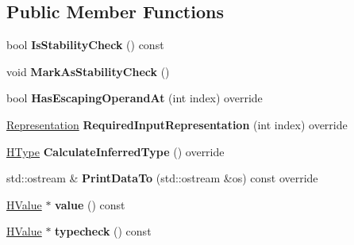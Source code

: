 \subsection*{Public Member Functions}
\begin{DoxyCompactItemize}
\item 
bool {\bfseries Is\+Stability\+Check} () const \hypertarget{classv8_1_1internal_1_1_h_check_maps_a13e2bd03de518bfae85d711193d50f32}{}\label{classv8_1_1internal_1_1_h_check_maps_a13e2bd03de518bfae85d711193d50f32}

\item 
void {\bfseries Mark\+As\+Stability\+Check} ()\hypertarget{classv8_1_1internal_1_1_h_check_maps_a2665115c8a59adaa1b01f99b6ab12d83}{}\label{classv8_1_1internal_1_1_h_check_maps_a2665115c8a59adaa1b01f99b6ab12d83}

\item 
bool {\bfseries Has\+Escaping\+Operand\+At} (int index) override\hypertarget{classv8_1_1internal_1_1_h_check_maps_af55ac5fbd767d9b586783daab161744f}{}\label{classv8_1_1internal_1_1_h_check_maps_af55ac5fbd767d9b586783daab161744f}

\item 
\hyperlink{classv8_1_1internal_1_1_representation}{Representation} {\bfseries Required\+Input\+Representation} (int index) override\hypertarget{classv8_1_1internal_1_1_h_check_maps_a0cb3d2a847298d3b61a7a5e66409e73c}{}\label{classv8_1_1internal_1_1_h_check_maps_a0cb3d2a847298d3b61a7a5e66409e73c}

\item 
\hyperlink{classv8_1_1internal_1_1_h_type}{H\+Type} {\bfseries Calculate\+Inferred\+Type} () override\hypertarget{classv8_1_1internal_1_1_h_check_maps_a465f2084f3740524ca42bb0e29cf7129}{}\label{classv8_1_1internal_1_1_h_check_maps_a465f2084f3740524ca42bb0e29cf7129}

\item 
std\+::ostream \& {\bfseries Print\+Data\+To} (std\+::ostream \&os) const  override\hypertarget{classv8_1_1internal_1_1_h_check_maps_a6f2b6992e675578308f5b8205ac3d1ad}{}\label{classv8_1_1internal_1_1_h_check_maps_a6f2b6992e675578308f5b8205ac3d1ad}

\item 
\hyperlink{classv8_1_1internal_1_1_h_value}{H\+Value} $\ast$ {\bfseries value} () const \hypertarget{classv8_1_1internal_1_1_h_check_maps_a194a8cfbf15ab43842c375a2bb975151}{}\label{classv8_1_1internal_1_1_h_check_maps_a194a8cfbf15ab43842c375a2bb975151}

\item 
\hyperlink{classv8_1_1internal_1_1_h_value}{H\+Value} $\ast$ {\bfseries typecheck} () const \hypertarget{classv8_1_1internal_1_1_h_check_maps_a67b2b28c7955020467fecce5c7926a87}{}\label{classv8_1_1internal_1_1_h_check_maps_a67b2b28c7955020467fecce5c7926a87}


\end{DoxyCompactItemize}
